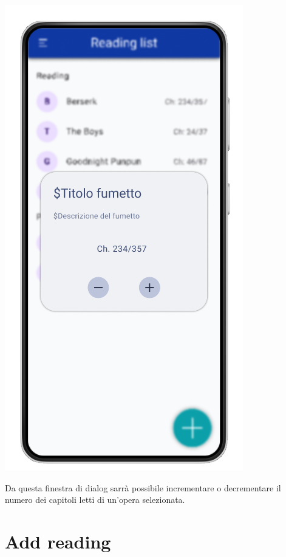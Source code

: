 \documentclass{report}
\begin{document}
\begin{center}
   \includegraphics[scale=0.4]{info_reading.png}
\end{center}

Da questa finestra di dialog sarrà possibile incrementare o decrementare il numero dei capitoli letti di un'opera selezionata.

\section{Add reading}
\end{document}
